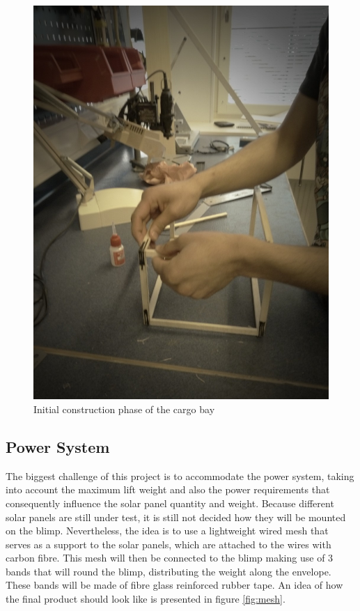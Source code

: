 \begin{figure}[bht]
\centering
\includegraphics[width=\textwidth]{figures/boxinit.jpg}
\caption{Initial construction phase of the cargo bay}
\label{fig:boxinit}
\end{figure}

\subsection{Power System}

The biggest challenge of this project is to accommodate the power system, taking into account the maximum lift weight and also the power requirements that consequently influence the solar panel quantity and weight. Because different solar panels are still under test, it is still not decided how they will be mounted on the blimp. Nevertheless, the idea is to use a lightweight wired mesh that serves as a support to the solar panels, which are attached to the wires with carbon fibre. This mesh will then be connected to the blimp making use of 3 bands that will round the blimp, distributing the weight along the envelope. These bands will be made of fibre glass reinforced rubber tape. An idea of how the final product should look like is presented in figure \ref{fig:mesh}.

